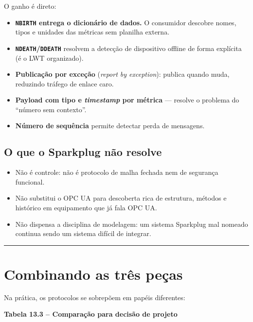 O ganho é direto:

\begin{itemize}
\tightlist
\item
  \textbf{\passthrough{\lstinline!NBIRTH!} entrega o dicionário de dados.} O consumidor descobre nomes, tipos e unidades das métricas sem planilha externa.
\item
  \textbf{\passthrough{\lstinline!NDEATH!}/\passthrough{\lstinline!DDEATH!}} resolvem a detecção de dispositivo offline de forma explícita (é o LWT organizado).
\item
  \textbf{Publicação por exceção} (\emph{report by exception}): publica quando muda, reduzindo tráfego de enlace caro.
\item
  \textbf{Payload com tipo e \emph{timestamp} por métrica} --- resolve o problema do ``número sem contexto''.
\item
  \textbf{Número de sequência} permite detectar perda de mensagens.
\end{itemize}

\subsection{\texorpdfstring{O que o Sparkplug \textbf{não} resolve}{O que o Sparkplug não resolve}}\label{o-que-o-sparkplug-nuxe3o-resolve}

\begin{itemize}
\tightlist
\item
  Não é controle: não é protocolo de malha fechada nem de segurança funcional.
\item
  Não substitui o OPC UA para descoberta rica de estrutura, métodos e histórico em equipamento que já fala OPC UA.
\item
  Não dispensa a disciplina de modelagem: um sistema Sparkplug mal nomeado continua sendo um sistema difícil de integrar.
\end{itemize}

\begin{center}\rule{0.5\linewidth}{0.5pt}\end{center}

\section{Combinando as três peças}\label{combinando-as-truxeas-peuxe7as}

Na prática, os protocolos se sobrepõem em papéis diferentes:

\textbf{Tabela 13.3 -- Comparação para decisão de projeto}

